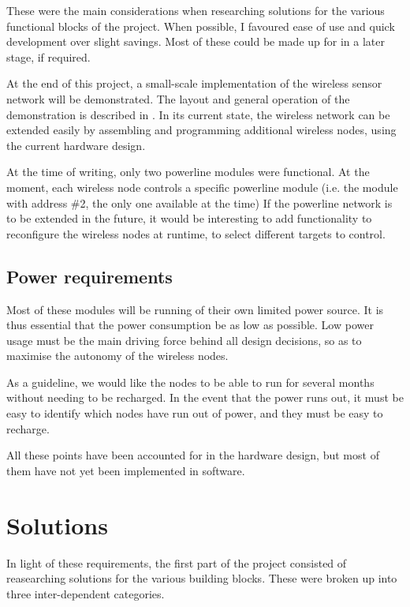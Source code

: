 These were the main considerations when researching solutions for the various
functional blocks of the project. When possible, I favoured ease of use and
quick development over slight savings. Most of these could be made up for in a
later stage, if required.

At the end of this project, a small-scale implementation of the wireless sensor
network will be demonstrated. The layout and general operation of the
demonstration is described in . In its current state,
the wireless network can be extended easily by assembling and programming
additional wireless nodes, using the current hardware design.

At the time of writing, only two powerline modules were functional. At the
moment, each wireless node controls a specific powerline module (i.e. the module
with address \#2, the only one available at the time) If the powerline network is
to be extended in the future, it would be interesting to add functionality to
reconfigure the wireless nodes at runtime, to select different targets to
control.

\subsection{Power requirements}
Most of these modules will be running of their own limited power source. It is
thus essential that the power consumption be as low as possible. Low power usage
must be the main driving force behind all design decisions, so as to maximise
the autonomy of the wireless nodes. 

As a guideline, we would like the nodes to be able to run for several months
without needing to be recharged. In the event that the power runs out, it must
be easy to identify which nodes have run out of power, and they must be easy to
recharge. 

All these points have been accounted for in the hardware design, but most of
them have not yet been implemented in software. 

\section{Solutions}
In light of these requirements, the first part of the project consisted of
reasearching solutions for the various building blocks. These were broken up
into three inter-dependent categories. 

